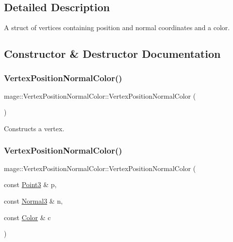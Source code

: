 \subsection{Detailed Description}
A struct of vertices containing position and normal coordinates and a color. 

\subsection{Constructor \& Destructor Documentation}
\hypertarget{structmage_1_1_vertex_position_normal_color_a8c8eff8f2fc3520bec482e89e2b32119}{}\label{structmage_1_1_vertex_position_normal_color_a8c8eff8f2fc3520bec482e89e2b32119} 
\subsubsection{\texorpdfstring{Vertex\+Position\+Normal\+Color()}{VertexPositionNormalColor()}\hspace{0.1cm}{\footnotesize\ttfamily [1/4]}}
{\footnotesize\ttfamily mage\+::\+Vertex\+Position\+Normal\+Color\+::\+Vertex\+Position\+Normal\+Color (\begin{DoxyParamCaption}{ }\end{DoxyParamCaption})\hspace{0.3cm}{\ttfamily [default]}}

Constructs a vertex. \hypertarget{structmage_1_1_vertex_position_normal_color_a1e0518d632c45c88d5328c1ae1f549a9}{}\label{structmage_1_1_vertex_position_normal_color_a1e0518d632c45c88d5328c1ae1f549a9} 
\subsubsection{\texorpdfstring{Vertex\+Position\+Normal\+Color()}{VertexPositionNormalColor()}\hspace{0.1cm}{\footnotesize\ttfamily [2/4]}}
{\footnotesize\ttfamily mage\+::\+Vertex\+Position\+Normal\+Color\+::\+Vertex\+Position\+Normal\+Color (\begin{DoxyParamCaption}\item[{const \hyperlink{structmage_1_1_point3}{Point3} \&}]{p,  }\item[{const \hyperlink{structmage_1_1_normal3}{Normal3} \&}]{n,  }\item[{const \hyperlink{structmage_1_1_color}{Color} \&}]{c }\end{DoxyParamCaption})\hspace{0.3cm}{\ttfamily [explicit]}}


